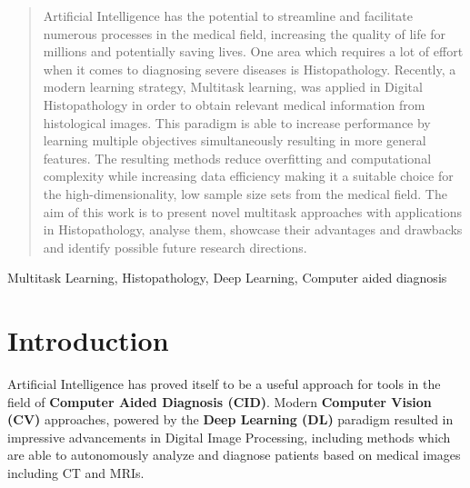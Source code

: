 \documentclass[conference]{IEEEtran}
\begin{document}
\maketitle

\begin{abstract}
Artificial Intelligence has the potential to streamline and facilitate numerous processes in the medical field, increasing the quality of life for millions and potentially saving lives. One area which requires a lot of effort when it comes to diagnosing severe diseases is Histopathology. Recently, a modern learning strategy, Multitask learning, was applied in Digital Histopathology in order to obtain relevant medical information from histological images. This paradigm is able to increase performance by learning multiple objectives simultaneously resulting in more general features. The resulting methods reduce overfitting and computational complexity while increasing data efficiency making it a suitable choice for the high-dimensionality, low sample size sets from the medical field. The aim of this work is to present novel multitask approaches with applications in Histopathology, analyse them, showcase their advantages and drawbacks and identify possible future research directions.
\end{abstract}

\begin{IEEEkeywords}
Multitask Learning, Histopathology, Deep Learning, Computer aided diagnosis 
\end{IEEEkeywords}



%
\IEEEpeerreviewmaketitle



\section{Introduction}
\label{chapter:introduction}

Artificial Intelligence has proved itself to be a useful approach for tools in the field of \textbf{Computer Aided Diagnosis (CID)}. Modern \textbf{Computer Vision (CV)} approaches, powered by the \textbf{Deep Learning (DL)} \cite{lecun2015deep} paradigm resulted in impressive advancements in Digital Image Processing, including methods which are able to autonomously analyze and diagnose patients based on medical images including CT and MRIs.
\end{document}

